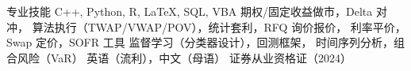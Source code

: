\begin{rubric}{专业技能}
\entry*[编程语言]%
	C++, Python, R, \LaTeX, SQL, VBA
\entry*[金融\&量化]%
	期权/固定收益做市，Delta 对冲，
	算法执行（TWAP/VWAP/POV），统计套利，RFQ 询价报价，
	利率平价，Swap 定价，SOFR 工具
\entry*[机器学习\&数据]%
	监督学习（分类器设计），回测框架，
	时间序列分析，组合风险（VaR）
\entry*[语言能力]%
	英语（流利），中文（母语）
\entry*[专业资格]%
	证券从业资格证（2024）
\end{rubric}
